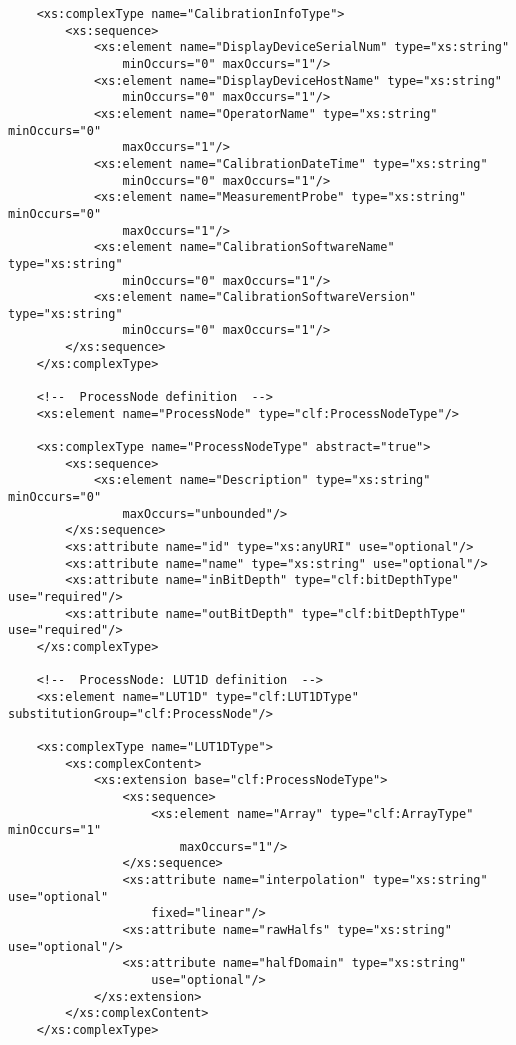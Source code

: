 \begin{lstlisting}
    <xs:complexType name="CalibrationInfoType">
        <xs:sequence>
            <xs:element name="DisplayDeviceSerialNum" type="xs:string" 
                minOccurs="0" maxOccurs="1"/>
            <xs:element name="DisplayDeviceHostName" type="xs:string" 
                minOccurs="0" maxOccurs="1"/>
            <xs:element name="OperatorName" type="xs:string" minOccurs="0" 
                maxOccurs="1"/>
            <xs:element name="CalibrationDateTime" type="xs:string" 
                minOccurs="0" maxOccurs="1"/>
            <xs:element name="MeasurementProbe" type="xs:string" minOccurs="0" 
                maxOccurs="1"/>
            <xs:element name="CalibrationSoftwareName" type="xs:string" 
                minOccurs="0" maxOccurs="1"/>
            <xs:element name="CalibrationSoftwareVersion" type="xs:string" 
                minOccurs="0" maxOccurs="1"/>
        </xs:sequence>
    </xs:complexType>
    
    <!--  ProcessNode definition  -->
    <xs:element name="ProcessNode" type="clf:ProcessNodeType"/>
    
    <xs:complexType name="ProcessNodeType" abstract="true">
        <xs:sequence>
            <xs:element name="Description" type="xs:string" minOccurs="0" 
                maxOccurs="unbounded"/>
        </xs:sequence>
        <xs:attribute name="id" type="xs:anyURI" use="optional"/>
        <xs:attribute name="name" type="xs:string" use="optional"/>
        <xs:attribute name="inBitDepth" type="clf:bitDepthType" use="required"/>
        <xs:attribute name="outBitDepth" type="clf:bitDepthType" use="required"/>
    </xs:complexType>
    
    <!--  ProcessNode: LUT1D definition  -->
    <xs:element name="LUT1D" type="clf:LUT1DType" substitutionGroup="clf:ProcessNode"/>
    
    <xs:complexType name="LUT1DType">
        <xs:complexContent>
            <xs:extension base="clf:ProcessNodeType">
                <xs:sequence>
                    <xs:element name="Array" type="clf:ArrayType" minOccurs="1" 
                        maxOccurs="1"/>
                </xs:sequence>
                <xs:attribute name="interpolation" type="xs:string" use="optional"
                    fixed="linear"/>
                <xs:attribute name="rawHalfs" type="xs:string" use="optional"/>
                <xs:attribute name="halfDomain" type="xs:string" 
                    use="optional"/>
            </xs:extension>
        </xs:complexContent>
    </xs:complexType>
    

\end{lstlisting}
